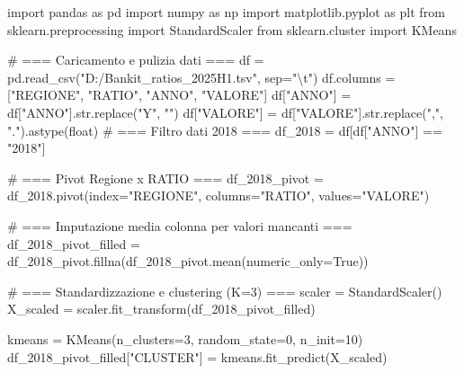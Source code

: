 \documentclass[
  letterpaper,
  DIV=11,
  numbers=noendperiod]{scrartcl}
\newenvironment{Shaded}{\begin{snugshade}}{\end{snugshade}}
\newcommand{\BuiltInTok}[1]{\textcolor[rgb]{0.00,0.23,0.31}{#1}}
\newcommand{\CharTok}[1]{\textcolor[rgb]{0.13,0.47,0.30}{#1}}
\newcommand{\CommentTok}[1]{\textcolor[rgb]{0.37,0.37,0.37}{#1}}
\newcommand{\DecValTok}[1]{\textcolor[rgb]{0.68,0.00,0.00}{#1}}
\newcommand{\ImportTok}[1]{\textcolor[rgb]{0.00,0.46,0.62}{#1}}
\newcommand{\NormalTok}[1]{\textcolor[rgb]{0.00,0.23,0.31}{#1}}
\newcommand{\OperatorTok}[1]{\textcolor[rgb]{0.37,0.37,0.37}{#1}}
\newcommand{\StringTok}[1]{\textcolor[rgb]{0.13,0.47,0.30}{#1}}
\newcommand{\VariableTok}[1]{\textcolor[rgb]{0.07,0.07,0.07}{#1}}
\begin{document}
\begin{Shaded}
\begin{Highlighting}[]
\ImportTok{import}\NormalTok{ pandas }\ImportTok{as}\NormalTok{ pd}
\ImportTok{import}\NormalTok{ numpy }\ImportTok{as}\NormalTok{ np}
\ImportTok{import}\NormalTok{ matplotlib.pyplot }\ImportTok{as}\NormalTok{ plt}
\ImportTok{from}\NormalTok{ sklearn.preprocessing }\ImportTok{import}\NormalTok{ StandardScaler}
\ImportTok{from}\NormalTok{ sklearn.cluster }\ImportTok{import}\NormalTok{ KMeans}

\CommentTok{\# === Caricamento e pulizia dati ===}
\NormalTok{df }\OperatorTok{=}\NormalTok{ pd.read\_csv(}\StringTok{"D:/Bankit\_ratios\_2025H1.tsv"}\NormalTok{, sep}\OperatorTok{=}\StringTok{"}\CharTok{\textbackslash{}t}\StringTok{"}\NormalTok{)}
\NormalTok{df.columns }\OperatorTok{=}\NormalTok{ [}\StringTok{"REGIONE"}\NormalTok{, }\StringTok{"RATIO"}\NormalTok{, }\StringTok{"ANNO"}\NormalTok{, }\StringTok{"VALORE"}\NormalTok{]}
\NormalTok{df[}\StringTok{"ANNO"}\NormalTok{] }\OperatorTok{=}\NormalTok{ df[}\StringTok{"ANNO"}\NormalTok{].}\BuiltInTok{str}\NormalTok{.replace(}\StringTok{"Y"}\NormalTok{, }\StringTok{""}\NormalTok{)}
\NormalTok{df[}\StringTok{"VALORE"}\NormalTok{] }\OperatorTok{=}\NormalTok{ df[}\StringTok{"VALORE"}\NormalTok{].}\BuiltInTok{str}\NormalTok{.replace(}\StringTok{","}\NormalTok{, }\StringTok{"."}\NormalTok{).astype(}\BuiltInTok{float}\NormalTok{)}
\CommentTok{\# === Filtro dati 2018 ===}
\NormalTok{df\_2018 }\OperatorTok{=}\NormalTok{ df[df[}\StringTok{"ANNO"}\NormalTok{] }\OperatorTok{==} \StringTok{"2018"}\NormalTok{]}

\CommentTok{\# === Pivot Regione x RATIO ===}
\NormalTok{df\_2018\_pivot }\OperatorTok{=}\NormalTok{ df\_2018.pivot(index}\OperatorTok{=}\StringTok{"REGIONE"}\NormalTok{, columns}\OperatorTok{=}\StringTok{"RATIO"}\NormalTok{, values}\OperatorTok{=}\StringTok{"VALORE"}\NormalTok{)}

\CommentTok{\# === Imputazione media colonna per valori mancanti ===}
\NormalTok{df\_2018\_pivot\_filled }\OperatorTok{=}\NormalTok{ df\_2018\_pivot.fillna(df\_2018\_pivot.mean(numeric\_only}\OperatorTok{=}\VariableTok{True}\NormalTok{))}

\CommentTok{\# === Standardizzazione e clustering (K=3) ===}
\NormalTok{scaler }\OperatorTok{=}\NormalTok{ StandardScaler()}
\NormalTok{X\_scaled }\OperatorTok{=}\NormalTok{ scaler.fit\_transform(df\_2018\_pivot\_filled)}

\NormalTok{kmeans }\OperatorTok{=}\NormalTok{ KMeans(n\_clusters}\OperatorTok{=}\DecValTok{3}\NormalTok{, random\_state}\OperatorTok{=}\DecValTok{0}\NormalTok{, n\_init}\OperatorTok{=}\DecValTok{10}\NormalTok{)}
\NormalTok{df\_2018\_pivot\_filled[}\StringTok{"CLUSTER"}\NormalTok{] }\OperatorTok{=}\NormalTok{ kmeans.fit\_predict(X\_scaled)}


\end{Highlighting}
\end{Shaded}
\end{document}
